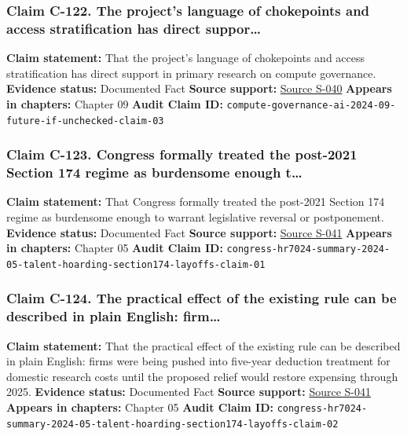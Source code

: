 \documentclass[
  american,
  11pt,
  letterpaper,
]{article}
\begin{document}
\subsubsection{Claim C-122. The project's language of chokepoints and
access stratification has direct
suppor\ldots{}}\label{claim-c-122-the-project-s-language-of-chokepoints-and-access-stratification-has-direct-suppor}

\textbf{Claim statement:} That the project's language of chokepoints and
access stratification has direct support in primary research on compute
governance. \textbf{Evidence status:} Documented Fact \textbf{Source
support:}
\hyperref[source-s-040-computing-power-and-the-governance-of-artificial-intelligence]{Source
S-040} \textbf{Appears in chapters:} Chapter 09 \textbf{Audit Claim ID:}
\texttt{compute-governance-ai-2024-09-future-if-unchecked-claim-03}

\subsubsection{Claim C-123. Congress formally treated the post-2021
Section 174 regime as burdensome enough
t\ldots{}}\label{claim-c-123-congress-formally-treated-the-post-2021-section-174-regime-as-burdensome-enough-t}

\textbf{Claim statement:} That Congress formally treated the post-2021
Section 174 regime as burdensome enough to warrant legislative reversal
or postponement. \textbf{Evidence status:} Documented Fact
\textbf{Source support:}
\hyperref[source-s-041-h-r-7024-tax-relief-for-american-families-and-workers-act-of-2024-crs-summary]{Source
S-041} \textbf{Appears in chapters:} Chapter 05 \textbf{Audit Claim ID:}
\texttt{congress-hr7024-summary-2024-05-talent-hoarding-section174-layoffs-claim-01}

\subsubsection{Claim C-124. The practical effect of the existing rule
can be described in plain English:
firm\ldots{}}\label{claim-c-124-the-practical-effect-of-the-existing-rule-can-be-described-in-plain-english-firm}

\textbf{Claim statement:} That the practical effect of the existing rule
can be described in plain English: firms were being pushed into
five-year deduction treatment for domestic research costs until the
proposed relief would restore expensing through 2025. \textbf{Evidence
status:} Documented Fact \textbf{Source support:}
\hyperref[source-s-041-h-r-7024-tax-relief-for-american-families-and-workers-act-of-2024-crs-summary]{Source
S-041} \textbf{Appears in chapters:} Chapter 05 \textbf{Audit Claim ID:}
\texttt{congress-hr7024-summary-2024-05-talent-hoarding-section174-layoffs-claim-02}
\end{document}
